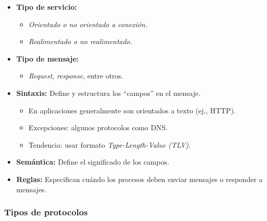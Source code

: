 \documentclass[a4paper,12pt]{article}
\begin{document}
\begin{itemize}
    \item \textbf{Tipo de servicio:} 
    \begin{itemize}
        \item \emph{Orientado o no orientado a conexión.}
        \item \emph{Realimentado o no realimentado.}
    \end{itemize}
    
    \item \textbf{Tipo de mensaje:}
    \begin{itemize}
        \item \emph{Request}, \emph{response}, entre otros.
    \end{itemize}
    
    \item \textbf{Sintaxis:} 
    Define y estructura los “campos” en el mensaje.
    \begin{itemize}
        \item En aplicaciones generalmente son orientados a texto (ej., HTTP).
        \item Excepciones: algunos protocolos como DNS.
        \item Tendencia: usar formato \emph{Type-Length-Value (TLV)}.
    \end{itemize}
    
    \item \textbf{Semántica:} 
    Define el significado de los campos.
    
    \item \textbf{Reglas:} 
    Especifican cuándo los procesos deben enviar mensajes o responder a mensajes.
\end{itemize}

\subsubsection{Tipos de protocolos}
\end{document}
